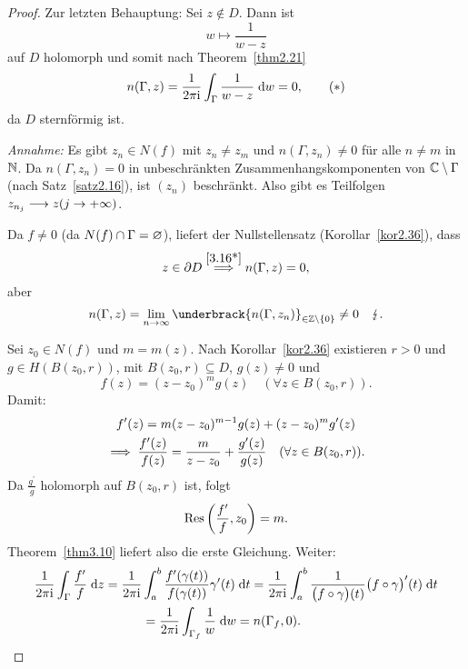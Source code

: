 \documentclass[a4paper,twoside,DIV15,BCOR12mm]{scrbook}
\begin{document}
\begin{proof}
Zur letzten Behauptung: Sei $z\notin D$. Dann ist 
\[w\mapsto\frac{1}{w-z}\]
auf $D$ holomorph und somit nach Theorem~\ref{thm2.21}
\[\label{3.16*}n(\Gamma,z) = \frac{1}{2\pi\mathrm{i}}\int_{\Gamma}^{}{\frac{1}{w-z}}\;\mathrm{d} w = 0,\tag{$*$}\]
da $D$ sternförmig ist.

\textit{Annahme:} Es gibt $z_n\in N(f)$ mit $z_n\neq z_m$ und $n(\Gamma,z_n)\neq 0$ für alle $n\neq m$ in $\mathbb{N}$. Da $n(\Gamma,z_n) = 0$ in unbeschränkten Zusammenhangskomponenten von $\mathbb{C}\setminus\Gamma$ (nach Satz~\ref{satz2.16}), ist $(z_n)$ beschränkt. Also gibt es Teilfolgen $z_{n_j}\longrightarrow z(j\to+\infty)$.

Da $f\neq 0$ (da $N(f)\cap\Gamma = \varnothing$), liefert der Nullstellensatz (Korollar~\ref{kor2.36}), dass
\[z\in\partial D \overset{\eqref{3.16*}}{\implies} n(\Gamma,z) = 0,\]
aber
\[n(\Gamma,z) = \lim_{n\to\infty} \underbrack{n(\Gamma,z_n)}_{\in\Z\setminus\{0\}} \neq 0\quad\blitz.\]

Sei $z_0\in N(f)$ und $m=m(z)$. Nach Korollar~\ref{kor2.36} existieren $r>0$ und $g\in H(B(z_0,r))$, mit $B(z_0,r)\subseteq D$, $g(z)\neq 0$ und 
\[f(z) = (z-z_0)^mg(z)\quad(\forall z\in B(z_0,r)).\]
Damit:
\begin{gather*}
f^\prime(z) = m(z-z_0)^{m-1}g(z)+(z-z_0)^mg^\prime(z)\\
\implies\frac{f^\prime(z)}{f(z)} = \frac{m}{z-z_0} + \frac{g^\prime(z)}{g(z)}\quad(\forall z\in B(z_0,r)).
\end{gather*}
Da $\frac{g^\prime}{g}$ holomorph auf $B(z_0,r)$ ist, folgt
\[\mathrm{Res}\left(\frac{f^\prime}{f},z_0\right) = m.\]
Theorem~\ref{thm3.10} liefert also die erste Gleichung. Weiter:
\begin{gather*}
\frac{1}{2\pi\mathrm{i}}\int_{\Gamma}^{}{\frac{f^\prime}{f}}\;\mathrm{d} z = \frac{1}{2\pi\mathrm{i}}\int_{a}^{b}{\frac{f^\prime(\gamma(t))}{f(\gamma(t))}\gamma^\prime(t)}\;\mathrm{d} t = \frac{1}{2\pi\mathrm{i}}\int_{a}^{b}{\frac{1}{\bigl(f\circ\gamma\bigr)(t)}\bigl(f\circ\gamma\bigr)^\prime(t)}\;\mathrm{d} t\\
 = \frac{1}{2\pi\mathrm{i}}\int_{\Gamma_f}^{}{\frac{1}{w}}\;\mathrm{d} w = n(\Gamma_f,0).\tag*{\qedhere}\end{gather*}
\end{proof}
\end{document}
